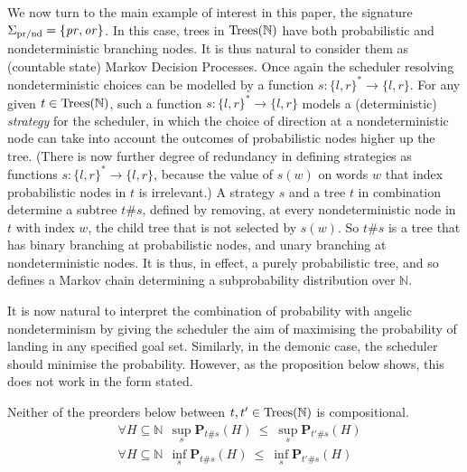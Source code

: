 We now turn to the main example of interest in this paper, the signature $\Sigma_{\text{pr/nd}} = \{\operatorname{\mathit{pr}},\operatorname{\mathit{or}}\}$.
In this case, trees in $\textnormal{Trees}(\mathbb{N})$ have both probabilistic and nondeterministic branching nodes.
It is thus natural to consider them as (countable state) Markov Decision Processes. Once again the 
scheduler resolving nondeterministic
choices can be modelled by a 
function $s: \{l,r\}^* \to \{l,r\}$. For any given $t \in \textnormal{Trees}(\mathbb{N})$, such a function
$s: \{l,r\}^* \to \{l,r\}$ models a (deterministic) \emph{strategy} for the scheduler, in which the choice of direction at a nondeterministic node  
can take into account the outcomes of probabilistic nodes higher up the tree.
(There is now further degree of redundancy in defining strategies as functions $s: \{l,r\}^* \to \{l,r\}$, because the value of $s(w)$ on words $w$ that index 
probabilistic nodes in $t$ is irrelevant.) A strategy $s$ and a tree $t$ in combination determine a subtree $t\#s$, defined by 
removing, at every nondeterministic node in $t$ with index $w$, the child tree that is not selected by $s(w)$. So $t\#s$ is a tree that has binary branching at probabilistic nodes, and unary branching at nondeterministic nodes. It is thus, in effect, a purely probabilistic tree, and so defines a Markov chain determining a subprobability distribution over $\mathbb{N}$. 

It is now natural to interpret the combination of probability with angelic nondeterminism 
by giving the scheduler the aim of maximising the probability of landing in any specified goal set. Similarly, in the demonic case, the scheduler should minimise the probability. However, as the proposition below shows, 
this does not work in the form stated. 
\begin{proposition}
Neither of the preorders below between $t,t' \in \textnormal{Trees}(\mathbb{N})$ is compositional.
\begin{align*}
& \forall H \subseteq \mathbb{N}  ~~ \sup_s  \mathbf{P}_{t\#s} (H)~ \leq~ \sup_s \mathbf{P}_{t'\#s} (H)
\\
& \forall H \subseteq \mathbb{N}  ~~ \inf_s  \mathbf{P}_{t\#s} (H)~ \leq~ \inf_s \mathbf{P}_{t'\#s} (H)
\end{align*}
\end{proposition}

